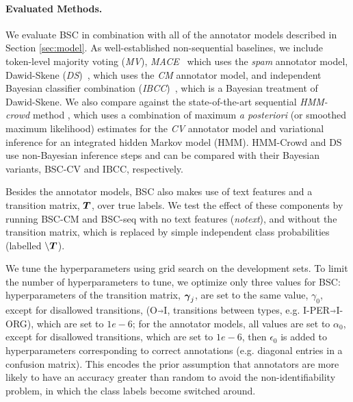 \paragraph{Evaluated Methods. }
We evaluate BSC in combination with all of the annotator models described in Section \ref{sec:model}.
As well-established non-sequential baselines, we include token-level majority voting (\emph{MV}), 
\emph{MACE}~\cite{hovy2013learning} which uses the \emph{spam} annotator
model,
Dawid-Skene (\emph{DS})~\cite{dawid_maximum_1979}, which uses the \emph{CM} annotator model,
 and independent Bayesian classifier combination (\emph{IBCC})~\cite{kim2012bayesian}, which is a Bayesian treatment of Dawid-Skene. 
We also compare against the state-of-the-art sequential \emph{HMM-crowd} method \cite{nguyen2017aggregating}, which uses a combination of 
maximum \emph{a posteriori} (or smoothed maximum likelihood) estimates for the \emph{CV} annotator model 
and variational inference for an integrated hidden Markov model (HMM). 
HMM-Crowd and DS use non-Bayesian inference steps and can be compared with
their Bayesian variants, BSC-CV and IBCC, respectively. 

Besides the annotator models, BSC also makes use of text features and a transition matrix, $\boldsymbol T$, over true labels.
We test the effect of these components by running BSC-CM and BSC-seq with no text features (\emph{notext}), 
and without the transition matrix, which is
 replaced by simple independent class probabilities (labelled $\backslash \boldsymbol T$).
 
We tune the hyperparameters using grid search on the development sets. To limit the number of hyperparameters to tune, 
we optimize only three values for BSC:
hyperparameters of the transition matrix, $\boldsymbol\gamma_j$, are set to the same value, 
$\gamma_0$, except for disallowed transitions, (O$\Arrow{0.2cm}$I, transitions between types, e.g. I-PER$\Arrow{0.2cm}$I-ORG), 
which are set to $1e-6$; 
for the annotator models,
all values are set to $\alpha_0$, except for disallowed transitions, which are set to $1e-6$,
then $\epsilon_0$ is added to hyperparameters 
corresponding to correct annotations (e.g. diagonal entries in a confusion matrix).
This encodes the prior assumption that annotators are more likely to have an accuracy greater than random to avoid the non-identifiability problem, in which the class labels become switched around.

